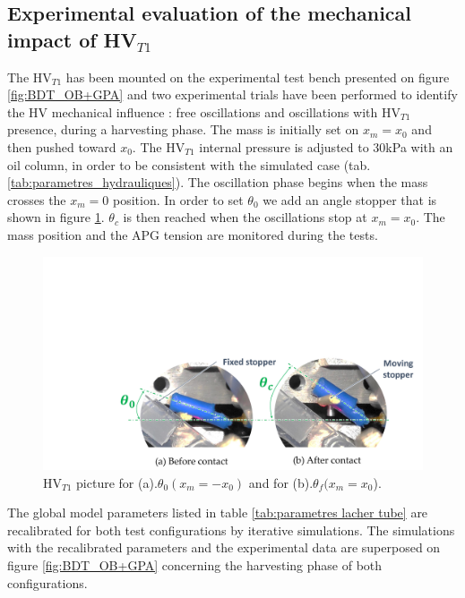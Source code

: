 \documentclass[3p,twocolumn,preprint]{elsarticle}
\begin{document}
	\subsection{Experimental evaluation of the mechanical impact of HV$_{T1}$}
The HV$_{T1}$ has been mounted on the experimental test bench presented on figure \ref{fig:BDT_OB+GPA} and two experimental trials have been performed to identify the HV mechanical influence : free oscillations and oscillations with HV$_{T1}$ presence, during a harvesting phase. The mass is initially set on $x_m=x_0$ and then pushed toward $x_0$. The HV$_{T1}$ internal pressure is adjusted to 30kPa with an oil column, in order to be consistent with the simulated case (tab. \ref{tab:parametres_hydrauliques}). The oscillation phase begins when the mass crosses the $x_m=0$ position. In order to set $\theta_0$ we add an angle stopper that is shown in figure \ref{fig:contact_M_VH_lachers}. $\theta_c$ is then reached when the oscillations stop at $x_m=x_0$. The mass position and the APG tension are monitored during the tests.
\begin{figure}[!htbp]
	\begin{center}
		\captionsetup{justification=centering}
		\includegraphics[trim={6.9cm 0cm 0cm 9cm},clip,width=0.9\linewidth]{figures/contact_M_VH_lachers.pdf}
		\caption{HV$_{T1}$ picture for (a).$\theta_0(x_m=-x_{0})$ and for (b).$\theta_f(x_m=x_0$).}
		\label{fig:contact_M_VH_lachers}
	\end{center}
\end{figure}

The global model parameters listed in table \ref{tab:parametres lacher tube} are recalibrated for both test configurations by iterative simulations. 
The simulations with the recalibrated parameters and the experimental data are superposed on figure \ref{fig:BDT_OB+GPA} concerning the harvesting phase of both configurations. 
\end{document}
